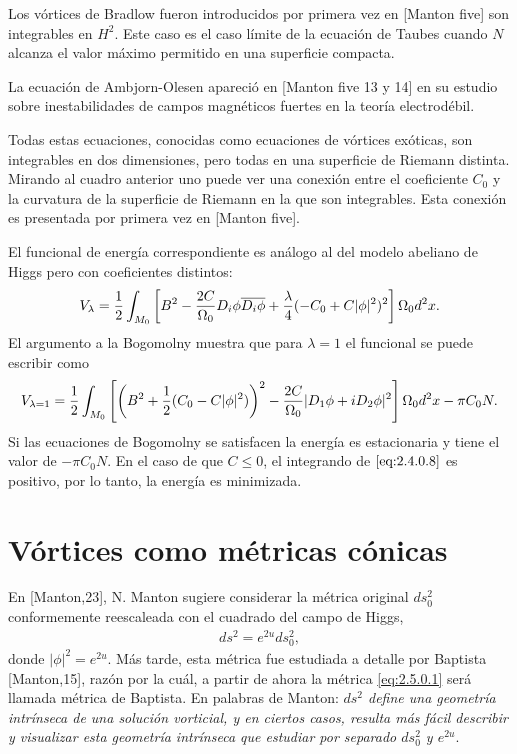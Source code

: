 Los vórtices de Bradlow fueron introducidos por primera vez en [Manton five] son integrables en $H^2$. Este caso es el caso límite de la ecuación de Taubes cuando $N$ alcanza el valor máximo permitido en una superficie compacta.

La ecuación de Ambjorn-Olesen apareció en [Manton five 13 y 14] en su estudio sobre inestabilidades de campos magnéticos fuertes en la teoría electrodébil.

Todas estas ecuaciones, conocidas como ecuaciones de vórtices exóticas, son integrables en dos dimensiones, pero todas en una superficie de Riemann distinta. Mirando al cuadro anterior uno puede ver una conexión entre el coeficiente $C_0$ y la curvatura de la superficie de Riemann en la que son integrables. Esta conexión es presentada por primera vez en [Manton five].


El funcional de energía correspondiente es análogo al del modelo abeliano de Higgs pero con coeficientes distintos:
\begin{align}
    V_{\lambda} = \frac{1}{2}\int_{M_0}\left[B^2-\frac{2C}{\Omega_0}D_i\phi\overline{D_i\phi}+\frac{\lambda}{4}(-C_0+C|\phi|^2)^2\right]\Omega_0 d^2x. \label{eq:2.4.0.7}
\end{align}
El argumento a la Bogomolny muestra que para $\lambda=1$ el funcional se puede escribir como
\begin{align}
    V_{\lambda=1} = \frac{1}{2}\int_{M_0}\left[\left(B^2+\frac{1}{2}(C_0-C|\phi|^2)\right)^2-\frac{2C}{\Omega_0}|D_1\phi+iD_2\phi|^2\right]\Omega_0 d^2x-\pi C_0 N. \label{eq:2.4.0.8}
\end{align}
Si las ecuaciones de Bogomolny se satisfacen la energía es estacionaria y tiene el valor de $-\pi C_0 N$. En el caso de que $C\leq 0$, el integrando de $\eqref{eq:2.4.0.8}$ es positivo, por lo tanto, la energía es minimizada.

\section{Vórtices como métricas cónicas}

En [Manton,23], N. Manton sugiere considerar la métrica original $ds_0^2$ conformemente reescaleada con el cuadrado del campo de Higgs,
\begin{align}
    ds^2 = e^{2u}ds_0^2,\label{eq:2.5.0.1}
\end{align}
donde $|\phi|^2=e^{2u}$. Más tarde, esta métrica fue estudiada a detalle por Baptista [Manton,15], razón por la cuál, a partir de ahora la métrica \eqref{eq:2.5.0.1} será llamada métrica de Baptista. En palabras de Manton: \emph{$ds^2$ define una geometría intrínseca de una solución vorticial, y en ciertos casos, resulta más fácil describir y visualizar esta geometría intrínseca que estudiar por separado $ds_0^2$ y $e^{2u}$}.

